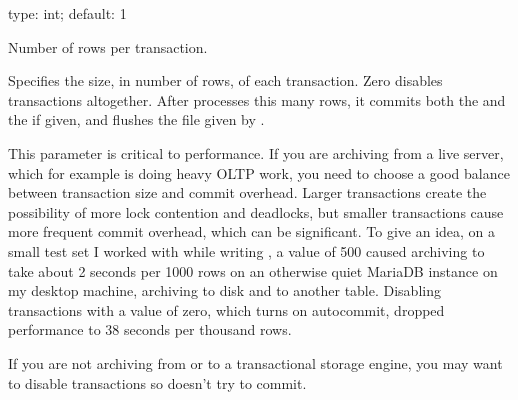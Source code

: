 \documentclass[letterpaper,10pt,english]{sphinxmanual}
\begin{document}
\begin{fulllineitems}
\label{\detokenize{mariadb-archiver:cmdoption-mariadb-archiver-txn-size}}
\sphinxAtStartPar
type: int; default: 1

\sphinxAtStartPar
Number of rows per transaction.

\sphinxAtStartPar
Specifies the size, in number of rows, of each transaction. Zero disables
transactions altogether.  After  processes this many rows, it
commits both the {\hyperref[\detokenize{mariadb-archiver:cmdoption-mariadb-archiver-source}]{}} and the {\hyperref[\detokenize{mariadb-archiver:cmdoption-mariadb-archiver-dest}]{}} if given, and flushes the
file given by {\hyperref[\detokenize{mariadb-archiver:cmdoption-mariadb-archiver-file}]{}}.

\sphinxAtStartPar
This parameter is critical to performance.  If you are archiving from a live
server, which for example is doing heavy OLTP work, you need to choose a good
balance between transaction size and commit overhead.  Larger transactions
create the possibility of more lock contention and deadlocks, but smaller
transactions cause more frequent commit overhead, which can be significant.  To
give an idea, on a small test set I worked with while writing , a
value of 500 caused archiving to take about 2 seconds per 1000 rows on an
otherwise quiet MariaDB instance on my desktop machine, archiving to disk and to
another table.  Disabling transactions with a value of zero, which turns on
autocommit, dropped performance to 38 seconds per thousand rows.

\sphinxAtStartPar
If you are not archiving from or to a transactional storage engine, you may
want to disable transactions so  doesn’t try to commit.

\end{fulllineitems}

\end{document}
